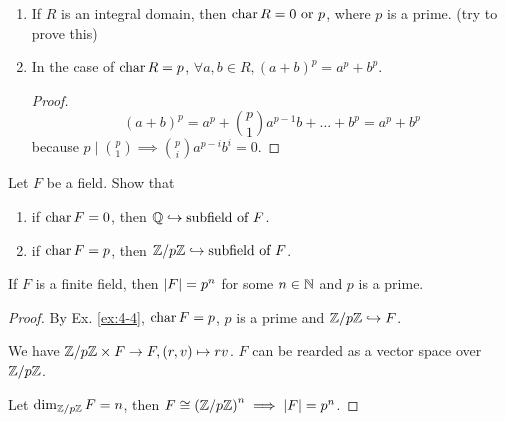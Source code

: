 \begin{prop} \mbox{}
  \begin{enumerate}
    \item If $R$ is an integral domain, then $\operatorname{char} R = 0 \text{~or~} p$,
      where $p$ is a prime. (try to prove this)
    \item In the case of $\operatorname{char} R = p$,
      $\forall a, b \in R, (a + b)^p = a^p + b^p$.
      \begin{proof}
        \[ (a+b)^p = a^p + \binom{p}{1}a^{p-1}b + \dots + b^p = a^p + b^p \]
        because $p \mid \binom{p}{1} \implies \binom{p}{i}a^{p-i}b^{i} = 0$.
      \end{proof}
  \end{enumerate}
\end{prop}

\begin{exercise}
  Let $F$ be a field. Show that
  \begin{enumerate}
    \item if $\operatorname{char} F = 0$, then $\mathbb{Q} \hookrightarrow \text{subfield of~} F$.
    \item if $\operatorname{char} F = p$, then
      ${\mathbb{Z}}/{p\mathbb{Z}} \hookrightarrow \text{subfield of~} F$.
  \end{enumerate}
  \label{ex:4-4}
\end{exercise}

\begin{theorem}
  If $F$ is a finite field, then $\lvert F\rvert = p^n$ for some $n \in \mathbb{N}$ and
  $p$ is a prime.
  \begin{proof}
    By Ex. \ref{ex:4-4}, $\operatorname{char} F = p$, $p$ is a prime and ${\mathbb{Z}}/{p\mathbb{Z}}
    \hookrightarrow F$.

    We have ${\mathbb{Z}}/{p\mathbb{Z}} \times F \to F, (r, v) \mapsto rv$.
    $F$ can be rearded as a vector space over ${\mathbb{Z}}/{p\mathbb{Z}}$.

    Let $\dim_{{\mathbb{Z}}/{p\mathbb{Z}}} F = n$, then $F \cong
    \left({\mathbb{Z}}/{p\mathbb{Z}}\right)^n \implies \lvert F\rvert = p^n$.
  \end{proof}
\end{theorem}

